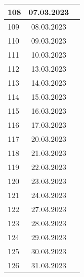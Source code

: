 \begin{longtable}{|l|c|l|}
108 & 07.03.2023    &                                                       \\ \hline
109 & 08.03.2023    &                                                       \\ \hline
110 & 09.03.2023    &                                                       \\ \hline
111 & 10.03.2023    &                                                       \\ \hline
112 & 13.03.2023    &                                                       \\ \hline
113 & 14.03.2023    &                                                       \\ \hline
114 & 15.03.2023    &                                                       \\ \hline
115 & 16.03.2023    &                                                       \\ \hline
116 & 17.03.2023    &                                                       \\ \hline
117 & 20.03.2023    &                                                       \\ \hline
118 & 21.03.2023    &                                                       \\ \hline
119 & 22.03.2023    &                                                       \\ \hline
120 & 23.03.2023    &                                                       \\ \hline
121 & 24.03.2023    &                                                       \\ \hline
122 & 27.03.2023    &                                                       \\ \hline
123 & 28.03.2023    &                                                       \\ \hline
124 & 29.03.2023    &                                                       \\ \hline
125 & 30.03.2023    &                                                       \\ \hline
126 & 31.03.2023    &                                                       \\ \hline












\end{longtable}